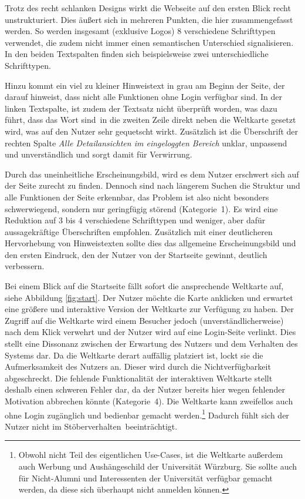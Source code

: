 {Trotz des recht schlanken Designs wirkt die Webseite auf den ersten Blick recht unstrukturiert. Dies äußert sich in mehreren Punkten, die hier zusammengefasst werden. 
So werden insgesamt (exklusive Logos) 8 verschiedene Schrifttypen verwendet, die zudem nicht immer einen semantischen Unterschied signalisieren. In den beiden Textspalten finden sich beispielsweise zwei unterschiedliche Schrifttypen. 

Hinzu kommt ein viel zu kleiner Hinweistext in grau am Beginn der Seite, der darauf hinweist, dass nicht alle Funktionen ohne Login verfügbar sind.
In der linken Textspalte, ist zudem der Textsatz nicht überprüft worden, was dazu führt, dass das Wort \glqq sind\grqq~in die zweiten Zeile direkt neben die Weltkarte gesetzt wird, was auf den Nutzer sehr gequetscht wirkt.
Zusätzlich ist die Überschrift der rechten Spalte \emph{Alle Detailansichten im eingeloggten Bereich} unklar, unpassend und unverständlich und sorgt damit für Verwirrung.
}
{Durch das uneinheitliche Erscheinungsbild, wird es dem Nutzer erschwert sich auf der Seite zurecht zu finden. Dennoch sind nach längerem Suchen die Struktur und alle Funktionen der Seite erkennbar, das Problem ist also nicht besonders schwerwiegend, sondern nur geringfügig störend (Kategorie~1).
}
{Es wird eine Reduktion auf 3 bis 4 verschiedene Schrifttypen und weniger, aber dafür aussagekräftige Überschriften empfohlen. Zusätzlich mit einer deutlicheren Hervorhebung von Hinweistexten sollte dies das allgemeine Erscheinungsbild und den ersten Eindruck, den der Nutzer von der Startseite gewinnt, deutlich verbessern.
}\label{prob:start:erschbild}

{Bei einem Blick auf die Startseite fällt sofort die ansprechende Weltkarte auf, siehe Abbildung \ref{fig:start}. 
Der Nutzer möchte die Karte anklicken und erwartet eine größere und interaktive Version der Weltkarte zur Verfügung zu haben.
Der Zugriff auf die Weltkarte wird einem Besucher jedoch (unverständlicherweise) nach dem Klick verwehrt und der Nutzer wird auf eine Login-Seite verlinkt. 
Dies stellt eine Dissonanz zwischen der Erwartung des Nutzers und dem Verhalten des Systems dar.
}{Da die Weltkarte derart auffällig platziert ist, lockt sie die Aufmerksamkeit des Nutzers an. Dieser wird durch die Nichtverfügbarkeit abgeschreckt. 
Die fehlende Funktionalität der interaktiven Weltkarte stellt deshalb einen schweren Fehler dar, da der Nutzer bereits hier wegen fehlender Motivation abbrechen könnte (Kategorie~4).}
{Die Weltkarte kann zweifellos auch ohne Login zugänglich und bedienbar gemacht werden.\footnote{Obwohl nicht Teil des eigentlichen Use-Cases, ist die Weltkarte außerdem auch Werbung und Aushängeschild der Universität Würzburg. Sie sollte auch für Nicht-Alumni und Interessenten der Universität verfügbar gemacht werden, da diese sich überhaupt nicht anmelden können.}
Dadurch fühlt sich der Nutzer nicht im \glqq Stöberverhalten\grqq ~beeinträchtigt.
}\label{prob:start:weltkarte}

